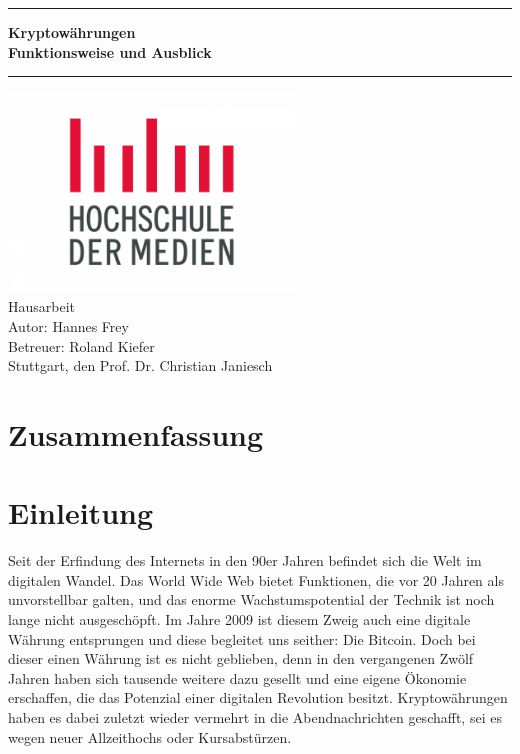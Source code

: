 \documentclass[12pt,oneside]{article}
\newcommand{\JMUTitle}[9]{

  \thispagestyle{empty}
  \vspace*{\stretch{1}}
  {\parindent0cm
  \rule{\linewidth}{.7ex}}
  \begin{flushright}
    \vspace*{\stretch{1}}
    \sffamily\bfseries\Huge
    #1\\
    \vspace*{\stretch{1}}
    \sffamily\bfseries\large
    #2
    \vspace*{\stretch{1}}
  \end{flushright}
  \rule{\linewidth}{.7ex}

  \vspace*{\stretch{1}}
  \begin{center}
    \includegraphics[width=3in]{logo} \\
    \vspace*{\stretch{1}}
    \Large Hausarbeit  \\

    \vspace*{\stretch{2}}
   \large Autor: Hannes Frey \\
    \vspace*{\stretch{1}}
    \large Betreuer:  Roland Kiefer \\[1mm]
    
    \vspace*{\stretch{1}}
    \large Stuttgart, den #6
  \end{center}
}
\begin{document}
  \JMUTitle
      {Kryptowährungen }        %
      {Funktionsweise und Ausblick}                        %
      
      {Wirtschaftswissenschaftlichen Fakultät}  %
      {W"urzburg 2018}                          %
      {31.05.2021}                              %
      {Prof. Dr. Christian Janiesch}               %
      {Zweitgutachter}                          %
      {Pr"ufungsdatum}                          %

  \clearpage

\lhead{}
    \setcounter{page}{1}

\tableofcontents
\clearpage

\listoffigures

\listoftables
\clearpage

\section*{Zusammenfassung}
\blindtext
\clearpage




\cleardoublepage
{}  
    \setcounter{page}{1}
\lhead{\nouppercase{\leftmark}}


\section{Einleitung} \label{einleitung}

Seit der Erfindung des Internets in den 90er Jahren befindet sich die Welt im digitalen Wandel. Das World Wide Web bietet Funktionen, die vor 20 Jahren als unvorstellbar galten, und das enorme Wachstumspotential der Technik ist noch lange nicht ausgeschöpft. Im Jahre 2009 ist diesem Zweig auch eine digitale Währung entsprungen und diese begleitet uns seither: Die Bitcoin. 
Doch bei dieser einen Währung ist es nicht geblieben, denn in den vergangenen Zwölf Jahren haben sich tausende weitere dazu gesellt und eine eigene Ökonomie erschaffen, die das Potenzial einer digitalen Revolution besitzt.
Kryptowährungen haben es dabei zuletzt wieder vermehrt in die Abendnachrichten geschafft, sei es wegen neuer Allzeithochs oder Kursabstürzen. 
\end{document}

